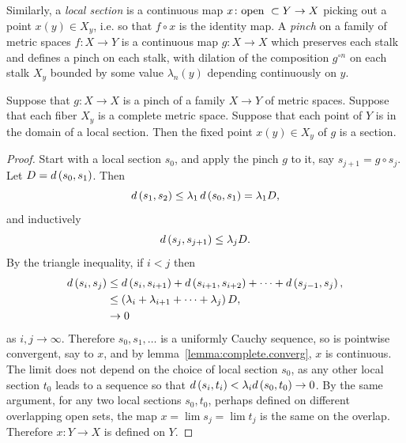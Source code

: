 Similarly, a \emph{local section} is a continuous map \(x \colon \text{open } \subset Y \to X\) picking out a point \(x(y) \in X_y\), i.e. so that \(f \circ x\) is the identity map.
A \emph{pinch} on a family of metric spaces \(f \colon X \to Y\) is a continuous map \(g \colon X \to X\) which preserves each stalk and defines a pinch on each stalk, with dilation of the composition \(g^{\circ n}\) on each stalk \(X_y\) bounded by some value \(\lambda_n(y)\) depending continuously on \(y\).
\begin{theorem}
Suppose that \(g \colon X \to X\) is a pinch of a family \(X \to Y\) of metric spaces.
Suppose that each fiber \(X_y\) is a complete metric space.
Suppose that each point of \(Y\) is in the domain of a local section.
Then the fixed point \(x(y) \in X_y\) of \(g\) is a section.
\end{theorem}
\begin{proof}
Start with a local section \(s_0\), and apply the pinch \(g\) to it, say \(s_{j+1} = g \circ s_j\).
Let \(D=d\left(s_0,s_1\right)\).
Then
\[
d\left(s_1,s_2\right) \le \lambda_1 \, d\left(s_0,s_1\right)=\lambda_1 D,
\]
and inductively
\[
d\left(s_j,s_{j+1}\right) \le \lambda_j D.
\]
By the triangle inequality, if \(i < j\) then
\begin{align*}
d\left(s_i,s_j\right) 
&\le 
d\left(s_i,s_{i+1}\right)+
d\left(s_{i+1},s_{i+2}\right)+
\dots
+d\left(s_{j-1},s_j\right),
\\
&
\le
\left(\lambda_i + \lambda_{i+1} + \dots + \lambda_j\right)D,
\\
&\to 0
\end{align*}
as \(i, j \to \infty\).
Therefore \(s_0, s_1, \dots\) is a uniformly Cauchy sequence, so is pointwise convergent, say to \(x\), and by lemma~\vref{lemma:complete.converg}, \(x\) is continuous.
The limit does not depend on the choice of local section \(s_0\), as any other local section \(t_0\) leads to a sequence so that \(d\left(s_i,t_i\right)<\lambda_i d\left(s_0,t_0\right) \to 0\).
By the same argument, for any two local sections \(s_0, t_0\), perhaps defined on different overlapping open sets, the map \(x=\lim s_j = \lim t_j\) is the same on the overlap.
Therefore \(x \colon Y \to X\) is defined on \(Y\).
\end{proof}

